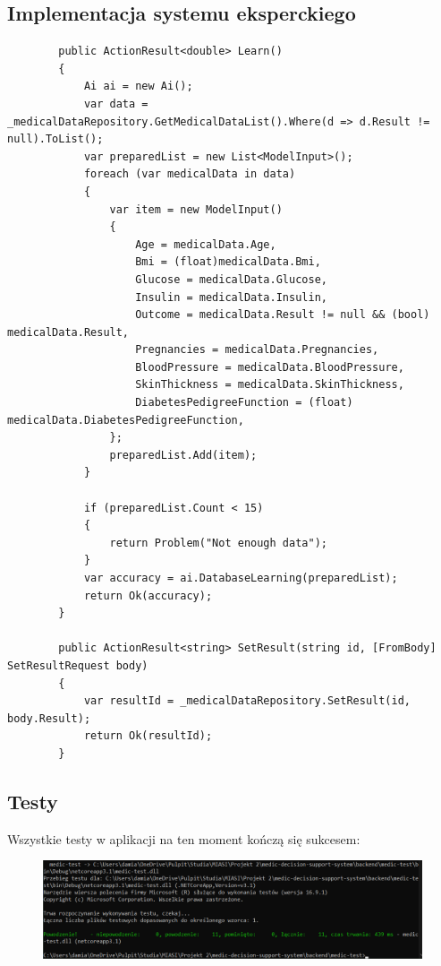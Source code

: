 \documentclass[12pt,a4paper]{article}
\begin{document}
	\subsection*{Implementacja systemu eksperckiego}
	\begin{lstlisting}
        public ActionResult<double> Learn()
        {
            Ai ai = new Ai();
            var data = _medicalDataRepository.GetMedicalDataList().Where(d => d.Result != null).ToList();
            var preparedList = new List<ModelInput>();
            foreach (var medicalData in data)
            {
                var item = new ModelInput()
                {
                    Age = medicalData.Age,
                    Bmi = (float)medicalData.Bmi,
                    Glucose = medicalData.Glucose,
                    Insulin = medicalData.Insulin,
                    Outcome = medicalData.Result != null && (bool) medicalData.Result,
                    Pregnancies = medicalData.Pregnancies,
                    BloodPressure = medicalData.BloodPressure,
                    SkinThickness = medicalData.SkinThickness,
                    DiabetesPedigreeFunction = (float) medicalData.DiabetesPedigreeFunction,
                };
                preparedList.Add(item);
            }

            if (preparedList.Count < 15)
            {
                return Problem("Not enough data");
            }
            var accuracy = ai.DatabaseLearning(preparedList);
            return Ok(accuracy);
        }
        
        public ActionResult<string> SetResult(string id, [FromBody] SetResultRequest body)
        {
            var resultId = _medicalDataRepository.SetResult(id, body.Result);
            return Ok(resultId);
        }
	\end{lstlisting}
	
	\subsection*{Testy}
Wszystkie testy w aplikacji na ten moment kończą się sukcesem:
\begin{figure}[h!]
\includegraphics[scale=0.65]{testy.png}
\end{figure}
	
\end{document}
